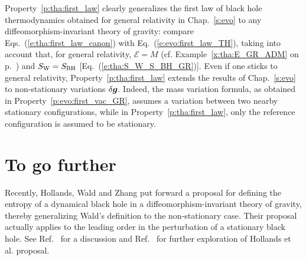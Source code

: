 Property~\ref{p:tha:first_law}
clearly generalizes the first law of
black hole thermodynamics obtained for general relativity in Chap.~\ref{s:evo}
to any diffeomorphism-invariant theory of gravity:
compare Eqs.~(\ref{e:tha:first_law_canon}) with
Eq.~(\ref{e:evo:first_law_TH}), taking into account that, for general relativity,
$\mathcal{E} = M$ (cf. Example~\ref{x:tha:E_GR_ADM} on p.~\pageref{x:tha:E_GR_ADM})
and $S_{\rm W} = S_{\rm BH}$ [Eq.~(\ref{e:tha:S_W_S_BH_GR})].
Even if one sticks to general relativity, Property~\ref{p:tha:first_law} extends
the results of Chap.~\ref{s:evo} to non-stationary variations
$\delta\bm{g}$. Indeed, the mass variation formula, as obtained in
Property~\ref{p:evo:first_vac_GR}, assumes a variation between two nearby
stationary configurations, while in Property~\ref{p:tha:first_law}, only
the reference configuration is assumed to be stationary.


\section{To go further}

Recently, Hollands, Wald and Zhang \cite{HollaWZ24,Wald24} put forward a proposal
for defining the entropy of a dynamical black hole in a diffeomorphism-invariant
theory of gravity, thereby generalizing Wald's definition \cite{Wald93} to
the non-stationary case. Their proposal actually applies to the leading order
in the perturbation of a stationary black hole. See
Ref.~\cite{Wald24} for a discussion and Ref.~\cite{VisseY24} for further
exploration of Hollands et al. proposal.

